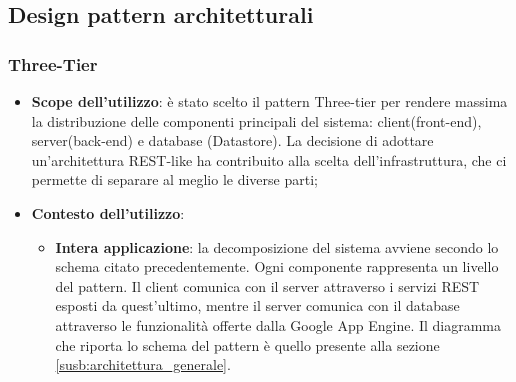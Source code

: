 %


\subsection{Design pattern architetturali} %
\label{sub:design_pattern_architetturali}
	\subsubsection{Three-Tier} %
	\label{ssub:three_tier}
		\begin{itemize}
			\item \textbf{Scope dell'utilizzo}: è stato scelto il pattern Three-tier per rendere massima la distribuzione delle componenti principali del sistema: client(front-end), server(back-end) e database (Datastore). La decisione di adottare un'architettura REST-like ha contribuito alla scelta dell'infrastruttura, che ci permette di separare al meglio le diverse parti;
			\item \textbf{Contesto dell'utilizzo}:
				\begin{itemize}
					\item \textbf{Intera applicazione}: la decomposizione del sistema avviene secondo lo schema citato precedentemente. Ogni componente rappresenta un livello del pattern. Il client comunica con il server attraverso i servizi REST esposti da quest'ultimo, mentre il server comunica con il database attraverso le funzionalità offerte dalla Google App Engine. \newline
					Il diagramma che riporta lo schema del pattern è quello presente alla sezione \ref{susb:architettura_generale}.
				\end{itemize}
		\end{itemize}


